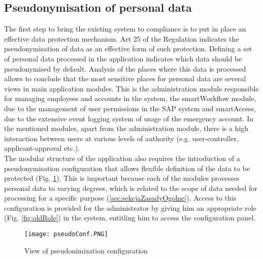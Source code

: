 \documentclass[en, noamssymb]{mgr}
\begin{document}


\subsection{Pseudonymisation of personal data}

The first step to bring the existing system to compliance is to put in place an effective data protection mechanism. Art 25 of the Regulation indicates the pseudonymisation of data as an effective form of such protection. Defining a set of personal data processed in the application indicates which data should be pseudonymised by default. Analysis of the places where this data is processed allows to conclude that the most sensitive places for personal data are several views in main application modules. This is the administration module responsible for managing employees and accounts in the system, the smartWorkflow module, due to the management of user permissions in the SAP system and smartAccess, due to the extensive event logging system of usage of the emergency account. In the mentioned modules, apart from the administration module, there is a high interaction between users at various levels of authority (e.g. user-controller, applicant-approval etc.).\\
\indent The modular structure of the application also requires the introduction of a pseudonymisation configuration that allows flexible definition of the data to be protected (Fig. \ref{fig:pseudonimizationConf}). This is important because each of the modules processes personal data to varying degrees, which is related to the scope of data needed for processing for a specific purpose (\ref{sec:sekcjaZasadyOgolne}). Access to this configuration is provided for the administrator by giving him an appropriate role (Fig. \ref{fig:oldRole}) in the system, entitling him to access the configuration panel.

\begin{figure}[H]
	\centering
	\texttt{[image: pseudoConf.PNG]}
	\caption[View of pseudonimization configuration]{View of pseudonimization configuration}
	\label{fig:pseudonimizationConf}
\end{figure}
\end{document}
